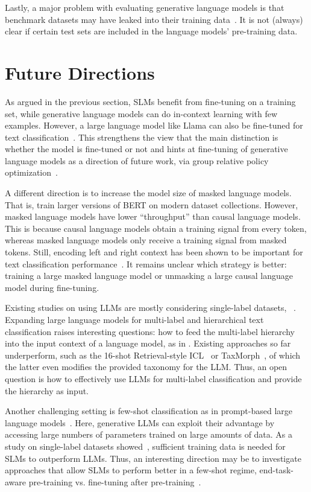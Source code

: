 \documentclass[lettersize,journal]{IEEEtran}
\newcommand{\GenLMs}{generative language models\xspace}
\newcommand{\SLMs}{SLMs\xspace}
\newcommand{\LLM}{LLM\xspace}
\newcommand{\LLMs}{LLMs\xspace}
\begin{document}
Lastly, a major problem with evaluating \GenLMs is that benchmark datasets may have leaked into their training data~\cite{balloccuLeakCheatRepeat2024}.
It is not (always) clear if certain test sets are included in the language models' pre-training data.

\section{Future Directions}\label{sec:future}

As argued in the previous section, \SLMs benefit from fine-tuning on a training set, while \GenLMs can do in-context learning with few examples. 
However, a large language model like Llama can also be fine-tuned for text classification~\cite{li2023label}.
This strengthens the view that the main distinction is whether the model is fine-tuned or not and hints at fine-tuning of \GenLMs as a direction of future work, \eg via group relative policy optimization~\cite{shao2024deepseekmath}.

A different direction is to increase the model size of masked language models. That is, train larger versions of BERT on modern dataset collections. However, masked language models have lower ``throughput'' than causal language models. This is because causal language models obtain a training signal from every token, whereas masked language models only receive a training signal from masked tokens. Still, encoding left and right context has been shown to be important for text classification performance~\cite{li2023label}.
It remains unclear which strategy is better: training a large masked language model or unmasking a large causal language model during fine-tuning.

Existing studies on using \LLMs are mostly considering single-label datasets, \eg~\cite{pushing-the-limit-11346014-rgpt,carp,DBLP:conf/emnlp/PecherSB25-100-samples}. 
Expanding large language models for multi-label and hierarchical text classification raises interesting questions: how to feed the multi-label hierarchy into the input context of a language model, \eg as in \cite{fatemi2024talk}.
Existing approaches so far underperform, such as the 16-shot Retrieval-style ICL~\cite{DBLP:journals/corr/abs-2406-17534-retrieval-style} or TaxMorph~\cite{taxmorph}, of which the latter even modifies the provided taxonomy for the \LLM.
Thus, an open question is how to effectively use \LLMs for multi-label classification and provide the hierarchy as input.

Another challenging setting is few-shot classification as in prompt-based large language models~\cite{DBLP:conf/nips/BrownMRSKDNSSAA20}.
Here, generative \LLMs can exploit their advantage by accessing large numbers of parameters trained on large amounts of data.
As a study on single-label datasets showed~\cite{DBLP:conf/emnlp/PecherSB25-100-samples}, sufficient training data is needed for \SLMs to outperform \LLMs.
Thus, an interesting direction may be to investigate approaches that allow \SLMs to perform better in a few-shot regime, \eg end-task-aware pre-training vs. fine-tuning after pre-training~\cite{dery2021should}.
\end{document}
